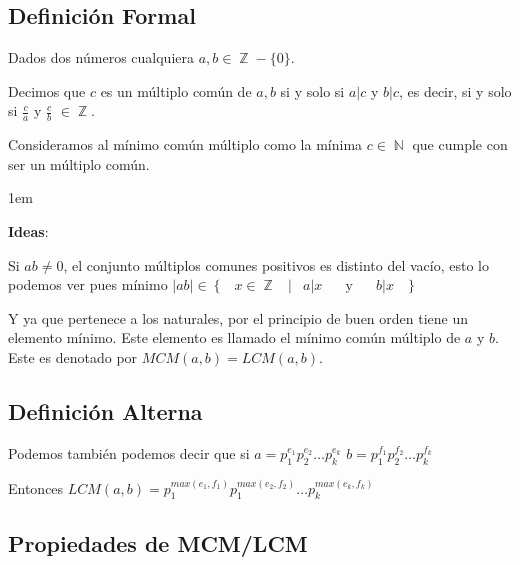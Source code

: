 \documentclass[12pt, fleqn]{report}                             %
\newenvironment{SmallIndentation}[1][0.75em]                    %
    {\begin{adjustwidth}{#1}{}\begin{footnotesize}}                 %
    {\end{footnotesize}\end{adjustwidth}}                           %
\DeclareMathOperator \Space {\quad}                             %
\DeclareMathOperator \MiniSpace {\;}                            %
\newcommand \Such {\MiniSpace|\MiniSpace}                       %
\newcommand \Also {\Space \text{y} \Space}                      %
\newcommand{\Set}[1]{\left\{ \MiniSpace #1 \MiniSpace \right\}} %
\DeclareMathOperator \Naturals  {\mathbb{N}}                     %
\DeclareMathOperator \Integers  {\mathbb{Z}}                     %
\begin{document}
        \subsection*{Definición Formal}

            Dados dos números cualquiera $a, b \in \Integers - \{0\}$.

            Decimos que $c$ es un múltiplo común de $a,b$ si y solo si $a|c$ y $b|c$, es decir,
            si y solo si $\frac{c}{a}$ y $\frac{c}{b}$ $\in \Integers$.

            Consideramos al mínimo común múltiplo como la mínima $c \in \Naturals$ que cumple
            con ser un múltiplo común.

            \begin{SmallIndentation}[1em]
                \textbf{Ideas}:

                Si $ab \neq 0$, el conjunto múltiplos comunes positivos es distinto del vacío,
                esto lo podemos ver pues mínimo $|ab| \in \Set{x \in \Integers \Such a|x \Also b|x}$

                Y ya que pertenece a los naturales, por el principio de buen orden tiene un
                elemento mínimo. Este elemento es llamado el mínimo común múltiplo de $a$ y $b$.
                Este es denotado por $MCM(a,b) = LCM(a,b)$.

            \end{SmallIndentation}


        \subsection*{Definición Alterna}

            Podemos también podemos decir que si
            $a = p_1^{e_1} p_2^{e_2} \dots p_k^{e_k}$
            $b = p_1^{f_1} p_2^{f_2} \dots p_k^{f_k}$

            Entonces $LCM(a, b) = p_1^{max(e_1, f_1)} p_1^{max(e_2, f_2)} \dots p_k^{max(e_k, f_k)}$



        \clearpage
        \subsection{Propiedades de MCM/LCM}
\end{document}
